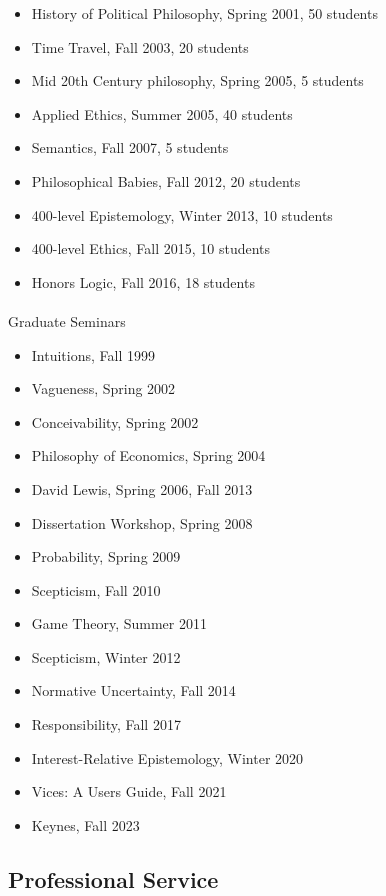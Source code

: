 \documentclass[
  10pt,
  letterpaper,
  DIV=11,
  numbers=noendperiod,
  twoside]{scrartcl}
\makeatletter
\let\oldparagraph\paragraph
\renewcommand{\paragraph}{
    \@ifstar
      \xxxParagraphStar
      \xxxParagraphNoStar
  }
\newcommand{\xxxParagraphStar}[1]{\oldparagraph*{#1}\mbox{}}
\newcommand{\xxxParagraphNoStar}[1]{\oldparagraph{#1}\mbox{}}
\providecommand{\tightlist}{%
  \setlength{\itemsep}{0pt}\setlength{\parskip}{0pt}}\usepackage{longtable,booktabs,array}
\makeatother
\begin{document}
\begin{itemize}
\tightlist
\item
  History of Political Philosophy, Spring 2001, 50 students
\item
  Time Travel, Fall 2003, 20 students
\item
  Mid 20th Century philosophy, Spring 2005, 5 students
\item
  Applied Ethics, Summer 2005, 40 students
\item
  Semantics, Fall 2007, 5 students
\item
  Philosophical Babies, Fall 2012, 20 students
\item
  400-level Epistemology, Winter 2013, 10 students
\item
  400-level Ethics, Fall 2015, 10 students
\item
  Honors Logic, Fall 2016, 18 students
\end{itemize}

\paragraph{Graduate Seminars}\label{graduate-seminars}

\begin{itemize}
\tightlist
\item
  Intuitions, Fall 1999
\item
  Vagueness, Spring 2002
\item
  Conceivability, Spring 2002
\item
  Philosophy of Economics, Spring 2004
\item
  David Lewis, Spring 2006, Fall 2013
\item
  Dissertation Workshop, Spring 2008
\item
  Probability, Spring 2009
\item
  Scepticism, Fall 2010
\item
  Game Theory, Summer 2011
\item
  Scepticism, Winter 2012
\item
  Normative Uncertainty, Fall 2014
\item
  Responsibility, Fall 2017
\item
  Interest-Relative Epistemology, Winter 2020
\item
  Vices: A Users Guide, Fall 2021
\item
  Keynes, Fall 2023
\end{itemize}

\subsection{Professional Service}\label{professional-service}
\end{document}
